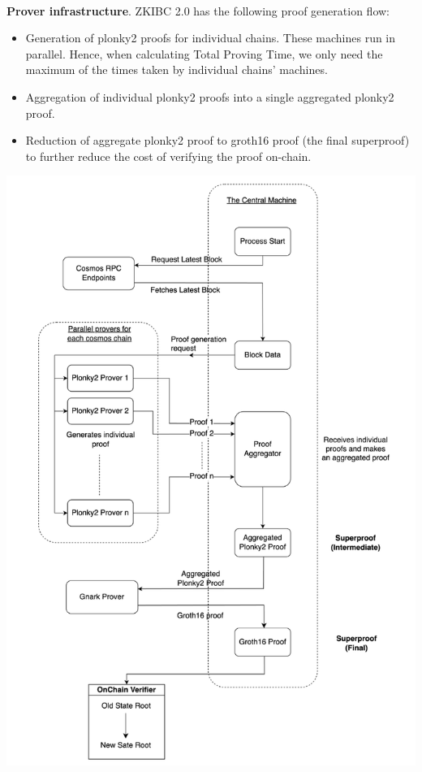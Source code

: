 \documentclass{article}
\begin{document}
~\\

\textbf{Prover infrastructure}. ZKIBC 2.0 has the following proof generation flow:
\begin{itemize}
    \item Generation of plonky2 proofs for individual chains. These machines run in parallel. Hence, when calculating Total Proving Time, we only need the maximum of the times taken by individual chains' machines.
    \item Aggregation of individual plonky2 proofs into a single aggregated plonky2 proof.
    \item Reduction of aggregate plonky2 proof to groth16 proof (the final superproof) to further reduce the cost of verifying the proof on-chain.
\end{itemize}


\includegraphics[width=1\linewidth]{ZKIBC_prover.png}
\end{document}
